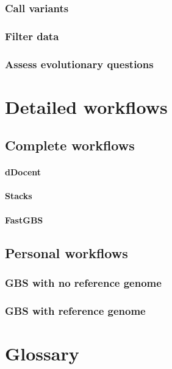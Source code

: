 \documentclass{article}
\begin{document}
\begin{sloppypar}
\subsubsection{Call variants}
\subsubsection{Filter data}
\subsubsection{Assess evolutionary questions}

\section{Detailed workflows}
\subsection{Complete workflows}
\paragraph{dDocent}
\paragraph{Stacks}
\paragraph{FastGBS}
\subsection{Personal workflows}
\subsubsection{GBS with no reference genome}
\subsubsection{GBS with reference genome}

\section{Glossary}





\end{sloppypar}
\end{document}
